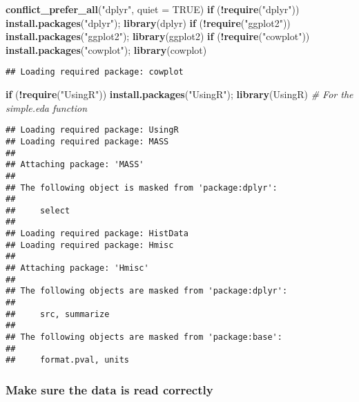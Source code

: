 \documentclass[
]{article}
\newenvironment{Shaded}{\begin{snugshade}}{\end{snugshade}}
\newcommand{\AttributeTok}[1]{\textcolor[rgb]{0.13,0.29,0.53}{#1}}
\newcommand{\CommentTok}[1]{\textcolor[rgb]{0.56,0.35,0.01}{\textit{#1}}}
\newcommand{\ConstantTok}[1]{\textcolor[rgb]{0.56,0.35,0.01}{#1}}
\newcommand{\ControlFlowTok}[1]{\textcolor[rgb]{0.13,0.29,0.53}{\textbf{#1}}}
\newcommand{\FunctionTok}[1]{\textcolor[rgb]{0.13,0.29,0.53}{\textbf{#1}}}
\newcommand{\NormalTok}[1]{#1}
\newcommand{\SpecialCharTok}[1]{\textcolor[rgb]{0.81,0.36,0.00}{\textbf{#1}}}
\newcommand{\StringTok}[1]{\textcolor[rgb]{0.31,0.60,0.02}{#1}}
\begin{document}
\begin{Shaded}
\begin{Highlighting}[]
\FunctionTok{conflict\_prefer\_all}\NormalTok{(}\StringTok{"dplyr"}\NormalTok{, }\AttributeTok{quiet =} \ConstantTok{TRUE}\NormalTok{)}
\ControlFlowTok{if}\NormalTok{ (}\SpecialCharTok{!}\FunctionTok{require}\NormalTok{(}\StringTok{"dplyr"}\NormalTok{)) }\FunctionTok{install.packages}\NormalTok{(}\StringTok{"dplyr"}\NormalTok{); }\FunctionTok{library}\NormalTok{(dplyr)}
\ControlFlowTok{if}\NormalTok{ (}\SpecialCharTok{!}\FunctionTok{require}\NormalTok{(}\StringTok{"ggplot2"}\NormalTok{)) }\FunctionTok{install.packages}\NormalTok{(}\StringTok{"ggplot2"}\NormalTok{); }\FunctionTok{library}\NormalTok{(ggplot2)}
\ControlFlowTok{if}\NormalTok{ (}\SpecialCharTok{!}\FunctionTok{require}\NormalTok{(}\StringTok{"cowplot"}\NormalTok{)) }\FunctionTok{install.packages}\NormalTok{(}\StringTok{"cowplot"}\NormalTok{); }\FunctionTok{library}\NormalTok{(cowplot)}
\end{Highlighting}
\end{Shaded}

\begin{verbatim}
## Loading required package: cowplot
\end{verbatim}

\begin{Shaded}
\begin{Highlighting}[]
\ControlFlowTok{if}\NormalTok{ (}\SpecialCharTok{!}\FunctionTok{require}\NormalTok{(}\StringTok{"UsingR"}\NormalTok{)) }\FunctionTok{install.packages}\NormalTok{(}\StringTok{"UsingR"}\NormalTok{); }\FunctionTok{library}\NormalTok{(UsingR) }\CommentTok{\# For the simple.eda function}
\end{Highlighting}
\end{Shaded}

\begin{verbatim}
## Loading required package: UsingR
## Loading required package: MASS
## 
## Attaching package: 'MASS'
## 
## The following object is masked from 'package:dplyr':
## 
##     select
## 
## Loading required package: HistData
## Loading required package: Hmisc
## 
## Attaching package: 'Hmisc'
## 
## The following objects are masked from 'package:dplyr':
## 
##     src, summarize
## 
## The following objects are masked from 'package:base':
## 
##     format.pval, units
\end{verbatim}

\subsubsection{Make sure the data is read
correctly}\label{make-sure-the-data-is-read-correctly}
\end{document}
